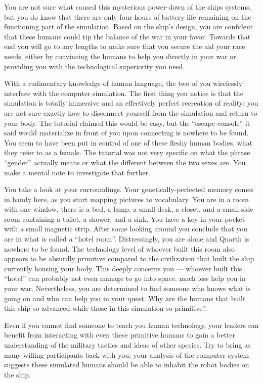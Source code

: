 \documentclass[char]{guildcamp1}
\begin{document}
You are not sure what caused this mysterious power-down of the ships systems, but you do know that there are only four hours of battery life remaining on the functioning part of the simulation.
Based on the ship's design, you are confident that these humans could tip the balance of the war in your favor. Towards that end you will go to any lengths to make sure that you secure the aid your race needs, either by convincing the humans to help you directly in your war or providing you with the technological superiority you need.

With a rudimentary knowledge of human language, the two of you wirelessly interface with the computer simulation. The first thing you notice is that the simulation is totally immersive and an effectively perfect recreation of reality: you are not sure exactly how to disconnect yourself from the simulation and return to your body. The tutorial claimed this would be easy, but the ``escape console'' it said would materialize in front of you upon connecting is nowhere to be found. You seem to have been put in control of one of these fleshy human bodies, what they refer to as a female. The tutorial was not very specific on what the phrase ``gender'' actually means or what the different between the two sexes are. You make a mental note to investigate that further.

You take a look at your surroundings. Your genetically-perfected memory comes in handy here, as you start mapping pictures to vocabulary. You are in a room with one window, there is a bed, a lamp, a small desk, a closet, and a small side room containing a toilet, a shower, and a sink. You have a key in your pocket with a small magnetic strip. After some looking around you conclude that you are in what is called a ``hotel room''. Distressingly, you are alone and Quarth is nowhere to be found. The technology level of whoever built this room also appears to be absurdly primitive compared to the civilization that built the ship currently housing your body. This deeply concerns you --- whoever built this ``hotel'' can probably not even manage to go into space, much less help you in your war. Nevertheless, you are determined to find someone who knows what is going on and who can help you in your quest. Why are the humans that built this ship so advanced while those in this simulation so primitive?

Even if you cannot find someone to teach you human technology, your leaders can benefit from interacting with even these primitive humans to gain a better understanding of the military tactics and ideas of other species. Try to bring as many willing participants back with you; your analysis of the computer system suggests these simulated humans should be able to inhabit the robot bodies on the ship.
\end{document}
